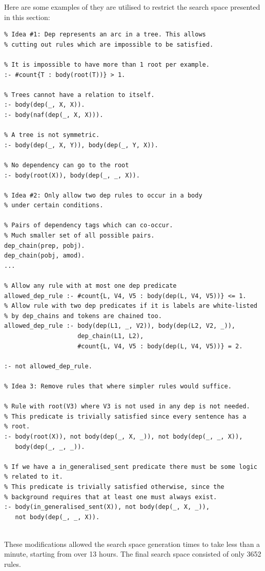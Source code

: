Here are some examples of they are utilised to restrict the search space presented in this section:
\begin{verbatim}
% Idea #1: Dep represents an arc in a tree. This allows 
% cutting out rules which are impossible to be satisfied.
    
% It is impossible to have more than 1 root per example.
:- #count{T : body(root(T))} > 1.

% Trees cannot have a relation to itself.
:- body(dep(_, X, X)).
:- body(naf(dep(_, X, X))).

% A tree is not symmetric.
:- body(dep(_, X, Y)), body(dep(_, Y, X)).

% No dependency can go to the root
:- body(root(X)), body(dep(_, _, X)).

% Idea #2: Only allow two dep rules to occur in a body
% under certain conditions. 

% Pairs of dependency tags which can co-occur.
% Much smaller set of all possible pairs.
dep_chain(prep, pobj).
dep_chain(pobj, amod).
...

% Allow any rule with at most one dep predicate
allowed_dep_rule :- #count{L, V4, V5 : body(dep(L, V4, V5))} <= 1.
% Allow rule with two dep predicates if it is labels are white-listed
% by dep_chains and tokens are chained too.
allowed_dep_rule :- body(dep(L1, _, V2)), body(dep(L2, V2, _)), 
                    dep_chain(L1, L2), 
                    #count{L, V4, V5 : body(dep(L, V4, V5))} = 2.

:- not allowed_dep_rule.

% Idea 3: Remove rules that where simpler rules would suffice.

% Rule with root(V3) where V3 is not used in any dep is not needed.
% This predicate is trivially satisfied since every sentence has a 
% root.
:- body(root(X)), not body(dep(_, X, _)), not body(dep(_, _, X)), 
   body(dep(_, _, _)).

% If we have a in_generalised_sent predicate there must be some logic 
% related to it.
% This predicate is trivially satisfied otherwise, since the 
% background requires that at least one must always exist.
:- body(in_generalised_sent(X)), not body(dep(_, X, _)), 
   not body(dep(_, _, X)).


\end{verbatim}

These modifications allowed the search space generation times to take less than a minute, starting from over 13 hours.
The final search space consisted of only 3652 rules.


